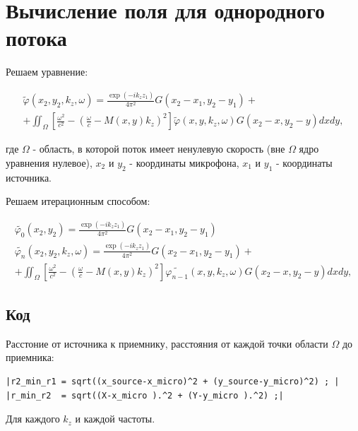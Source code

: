 \documentclass[a4paper,12pt,fleqn]{extreport} %
\begin{document}
\section{Вычисление поля для однородного потока}

Решаем уравнение:

\begin{equation}
\begin{aligned}
\tilde{\varphi}(x_2, y_2, k_z, \omega) = \frac{\exp (-i k_z z_1)}{4 \pi^2} G(x_2 - x_1, y_2 - y_1) + \\
+ \iint_{\Omega} \left[\frac{\omega^2}{c^2} - (\frac{\omega}{c} - M(x,y) k_z)^2\right] \tilde{\varphi}(x,y,k_z,\omega) G(x_2 - x, y_2 - y) dx dy,
\end{aligned}
\end{equation}

где $\Omega$ - область, в которой поток имеет ненулевую скорость (вне $\Omega$ ядро уравнения нулевое), $x_2$ и $y_2$ - координаты микрофона, $x_1$ и $y_1$ - координаты источника.

Решаем итерационным способом:

\begin{equation}
\begin{aligned}
\tilde{\varphi_0}(x_2,y_2) = \frac{\exp (-i k_z z_1)}{4 \pi^2} G(x_2 - x_1, y_2 - y_1)\\
\tilde{\varphi_n}(x_2, y_2, k_z, \omega) = \frac{\exp (-i k_z z_1)}{4 \pi^2} G(x_2 - x_1, y_2 - y_1) + \\
+ \iint_{\Omega} \left[\frac{\omega^2}{c^2} - (\frac{\omega}{c} - M(x,y) k_z)^2\right] \tilde{\varphi_{n-1}}(x,y,k_z,\omega) G(x_2 - x, y_2 - y) dx dy,
\end{aligned}
\end{equation}

\subsection{Код}

Расстоние от источника к приемнику, расстояния от каждой точки области $\Omega$ до приемника:

\begin{verbatim}
|r2_min_r1 = sqrt((x_source-x_micro)^2 + (y_source-y_micro)^2) ; |
|r_min_r2  = sqrt((X-x_micro ).^2 + (Y-y_micro ).^2) ;|
\end{verbatim}
Для каждого $k_z$ и каждой частоты.
\end{document}
